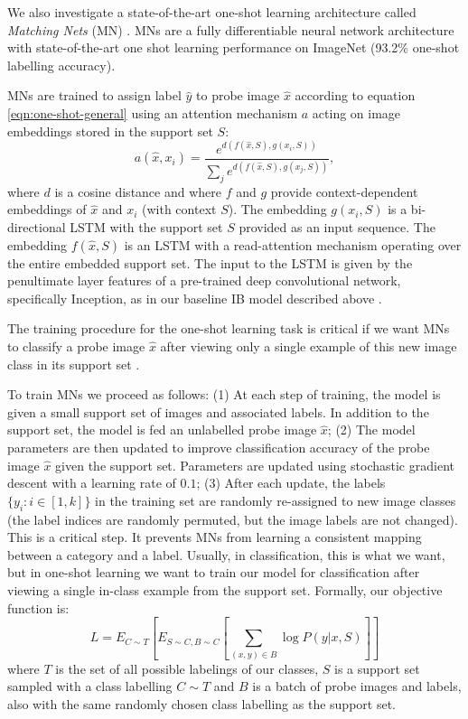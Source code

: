 \documentclass{article}
\begin{document}
We also investigate a state-of-the-art one-shot learning architecture called \emph{Matching Nets} (MN) \citep{vinyals2016matching}. MNs are a fully differentiable neural network architecture with state-of-the-art one shot learning performance on ImageNet (93.2\% one-shot labelling accuracy).  

MNs are trained to assign label $\hat{y}$ to probe image $\hat{x}$ according to equation \ref{eqn:one-shot-general} using an attention mechanism $a$ acting on image embeddings stored in  the support set $S$:
\begin{equation}
    a(\hat{x},x_i) = \frac{e^{d(f(\hat{x},S),g(x_i,S))}}{\sum_j e^{d(f(\hat{x},S),g(x_j,S)) }}, 
    \label{eqn:MNa}
\end{equation}
where $d$ is a cosine distance and where $f$ and $g$ provide context-dependent embeddings of $\hat{x}$ and $x_i$ (with context $S$). The embedding $g(x_i,S) $ is a bi-directional LSTM \citep{hochreiter1997long} with the support set $S$ provided as an input sequence. The embedding $f(\hat{x},S)$ is an LSTM with a read-attention mechanism operating over the entire embedded support set. The input to the LSTM is given by the penultimate layer features of a pre-trained deep convolutional network, specifically Inception, as in our baseline IB model described above \citep{szegedy2015going}. 

The training procedure for the one-shot learning task is critical if we want MNs to classify a probe image $\hat{x}$ after viewing only a single example of this new image class in its support set \citep{hochreiter2001learning,santoro2016meta}. 

To train MNs we proceed as follows: (1) At each step of training, the model is given a small support set of images and associated labels. In addition to the support set, the model is fed an unlabelled probe image $\hat{x}$; (2) The model parameters are then updated to improve classification accuracy of the probe image $\hat{x}$ given the support set. Parameters are updated using stochastic gradient descent with a learning rate of $0.1$; (3) After each update, the labels $\{y_i: i \in [1,k]\}$ in the training set are randomly re-assigned to new image classes (the label indices are randomly permuted, but the image labels are not changed). This is a critical step. It prevents MNs from learning a consistent mapping between a category and a label. Usually, in classification, this is what we want, but in one-shot learning we want to train our model for classification after viewing a single in-class example from the support set. Formally, our objective function is:
\begin{equation}
    L = E_{C\sim T}\left[ E_{S\sim C,B\sim C}\left[\displaystyle{\sum_{(x,y)\in B}\log P(y | x, S)}  \right]\right]
\end{equation}
where $T$ is the set of all possible labelings of our classes, $S$ is a support set sampled with a class labelling $C \sim T$ and $B$ is a batch of probe images and labels, also with the same randomly chosen class labelling as the support set. 
\end{document}
